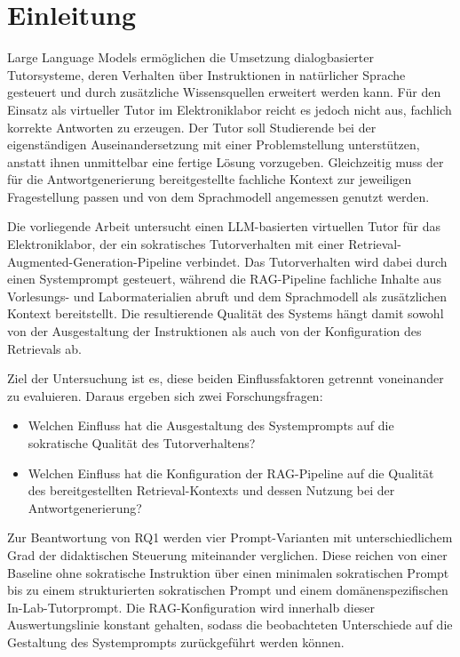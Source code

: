 \section{Einleitung}
\label{sec:einleitung}
 
Large Language Models ermöglichen die Umsetzung dialogbasierter Tutorsysteme, deren Verhalten über Instruktionen in natürlicher Sprache gesteuert und durch zusätzliche Wissensquellen erweitert werden kann. Für den Einsatz als virtueller Tutor im Elektroniklabor reicht es jedoch nicht aus, fachlich korrekte Antworten zu erzeugen. Der Tutor soll Studierende bei der eigenständigen Auseinandersetzung mit einer Problemstellung unterstützen, anstatt ihnen unmittelbar eine fertige Lösung vorzugeben. Gleichzeitig muss der für die Antwortgenerierung bereitgestellte fachliche Kontext zur jeweiligen Fragestellung passen und von dem Sprachmodell angemessen genutzt werden.
 
Die vorliegende Arbeit untersucht einen LLM-basierten virtuellen Tutor für das Elektroniklabor, der ein sokratisches Tutorverhalten mit einer Retrieval-Augmented-Generation-Pipeline verbindet. Das Tutorverhalten wird dabei durch einen Systemprompt gesteuert, während die RAG-Pipeline fachliche Inhalte aus Vorlesungs- und Labormaterialien abruft und dem Sprachmodell als zusätzlichen Kontext bereitstellt. Die resultierende Qualität des Systems hängt damit sowohl von der Ausgestaltung der Instruktionen als auch von der Konfiguration des Retrievals ab.
 
Ziel der Untersuchung ist es, diese beiden Einflussfaktoren getrennt voneinander zu evaluieren. Daraus ergeben sich zwei Forschungsfragen:
 
\begin{itemize}
  \item[\textbf{RQ1:}] Welchen Einfluss hat die Ausgestaltung des Systemprompts auf die sokratische Qualität des Tutorverhaltens?
  
  \item[\textbf{RQ2:}] Welchen Einfluss hat die Konfiguration der RAG-Pipeline auf die Qualität des bereitgestellten Retrieval-Kontexts und dessen Nutzung bei der Antwortgenerierung?
\end{itemize}
 
Zur Beantwortung von RQ1 werden vier Prompt-Varianten mit unterschiedlichem Grad der didaktischen Steuerung miteinander verglichen. Diese reichen von einer Baseline ohne sokratische Instruktion über einen minimalen sokratischen Prompt bis zu einem strukturierten sokratischen Prompt und einem domänenspezifischen In-Lab-Tutorprompt. Die RAG-Konfiguration wird innerhalb dieser Auswertungslinie konstant gehalten, sodass die beobachteten Unterschiede auf die Gestaltung des Systemprompts zurückgeführt werden können.
 
